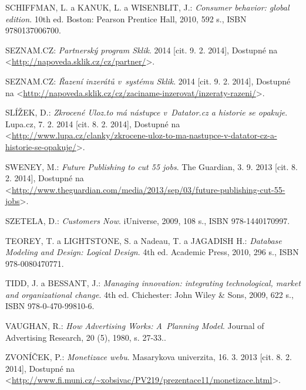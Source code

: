 \documentclass[12pt,oneside,openany]{fithesis}
\begin{document}
\begin{thebibliography}{99}
SCHIFFMAN, L. a KANUK, L. a WISENBLIT, J.: \emph{Consumer behavior: global edition}. 10th ed. Boston: Pearson Prentice Hall, 2010, 592 s., ISBN 9780137006700. 

SEZNAM.CZ: \emph{Partnerský program Sklik}. 2014 [cit. 9. 2. 2014], Dostupné na {\textless}\url{http://napoveda.sklik.cz/cz/partner/}{\textgreater}.

SEZNAM.CZ: \emph{Řazení inzerátů v~systému Sklik}. 2014 [cit. 9. 2. 2014], Dostupné na {\textless}\url{http://napoveda.sklik.cz/cz/zaciname-inzerovat/inzeraty-razeni/}{\textgreater}.

SLÍŽEK, D.: \emph{Zkrocené Uloz.to má nástupce v~Datator.cz a historie se opakuje}. Lupa.cz, 7. 2. 2014 [cit. 8. 2. 2014], Dostupné na {\textless}\url{http://www.lupa.cz/clanky/zkrocene-uloz-to-ma-nastupce-v-datator-cz-a-historie-se-opakuje/}{\textgreater}.

SWENEY, M.: \emph{Future Publishing to cut 55 jobs}. The Guardian, 3. 9. 2013 [cit. 8. 2. 2014], Dostupné na {\textless}\url{http://www.theguardian.com/media/2013/sep/03/future-publishing-cut-55-jobs}{\textgreater}.

SZETELA, D.: \emph{Customers Now}. iUniverse, 2009, 108 s., ISBN 978-1440170997. 

TEOREY, T. a LIGHTSTONE, S. a Nadeau, T. a JAGADISH H.: 
\emph{Database Modeling and Design: Logical Design}. 4th ed. Academic Press, 2010, 296 s., ISBN 978-0080470771.

TIDD, J. a BESSANT, J.: \emph{Managing innovation: integrating technological, market and
      organizational change}. 4th ed. Chichester: John Wiley \& Sons, 2009, 622 s., ISBN 978-0-470-99810-6.

VAUGHAN, R.: \emph{How Advertising Works: A~Planning Model}. Journal of Advertising Research, 20 (5), 1980, s. 27-33..

ZVONÍČEK, P.: \emph{Monetizace webu}. Masarykova univerzita, 16. 3. 2013 [cit. 8. 2. 2014], Dostupné na {\textless}\url{http://www.fi.muni.cz/~xobsivac/PV219/prezentace11/monetizace.html}{\textgreater}.

\end{thebibliography}


\newpage

\end{document}
